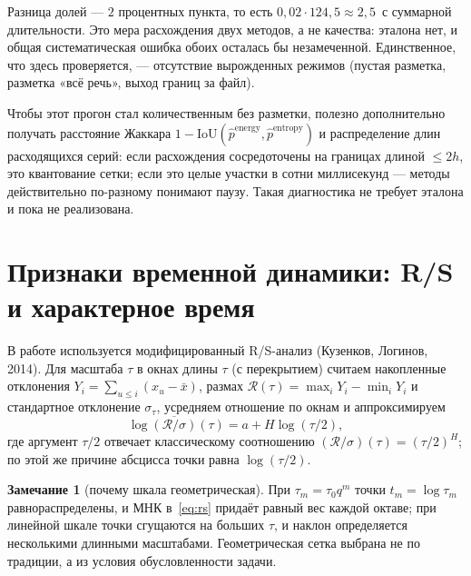 \documentclass[11pt,a4paper]{article}
\theoremstyle{definition}
\newtheorem{zam}{Замечание}[section]
\theoremstyle{plain}
\begin{document}
Разница долей --- $2$ процентных пункта, то есть $0{,}02\cdot124{,}5\approx2{,}5$~с
суммарной длительности. Это мера расхождения двух методов, а не качества:
эталона нет, и общая систематическая ошибка обоих осталась бы незамеченной.
Единственное, что здесь проверяется, --- отсутствие вырожденных режимов
(пустая разметка, разметка «всё речь», выход границ за файл).

Чтобы этот прогон стал количественным без разметки, полезно дополнительно
получать расстояние Жаккара $1-\mathrm{IoU}(\hat p^{\text{energy}},\hat
p^{\text{entropy}})$ и распределение длин расходящихся серий: если расхождения
сосредоточены на границах длиной $\le2h$, это квантование сетки; если это
целые участки в сотни миллисекунд --- методы действительно по-разному
понимают паузу. Такая диагностика не требует эталона и пока не реализована.

\section{Признаки временной динамики: R/S и характерное время}

В работе используется модифицированный R/S-анализ (Кузенков, Логинов, 2014).
Для масштаба $\tau$ в окнах длины $\tau$ (с перекрытием) считаем накопленные
отклонения $Y_i=\sum_{u\le i}(x_u-\bar x)$,
размах $\mathcal R(\tau)=\max_iY_i-\min_iY_i$ и стандартное отклонение
$\sigma_\tau$, усредняем отношение по окнам и аппроксимируем
\begin{equation}\label{eq:rs}
\log\overline{(\mathcal R/\sigma)}(\tau)=a+H\log(\tau/2),
\end{equation}
где аргумент $\tau/2$ отвечает классическому соотношению
$(\mathcal R/\sigma)(\tau)=(\tau/2)^H$; по этой же причине абсцисса точки равна
$\log(\tau/2)$.

\begin{zam}[почему шкала геометрическая]
При $\tau_m=\tau_0q^m$ точки $t_m=\log\tau_m$ равнораспределены, и МНК
в~\eqref{eq:rs} придаёт равный вес каждой октаве; при линейной шкале точки
сгущаются на больших $\tau$, и наклон определяется несколькими длинными
масштабами. Геометрическая сетка выбрана не по традиции, а из условия
обусловленности задачи.
\end{zam}
\end{document}
